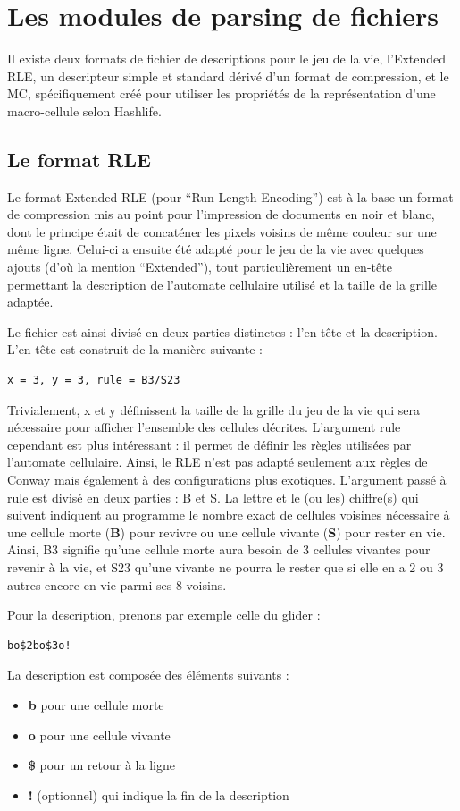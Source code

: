 \documentclass[a4paper,12pt]{report}
\begin{document}
\section{Les modules de parsing de fichiers}\label{section:parsing}

Il existe deux formats de fichier de descriptions pour le jeu de la vie,
l'Extended RLE, un descripteur simple et standard dérivé d'un format de
compression, et le MC, spécifiquement créé pour utiliser les propriétés de
la représentation d'une macro-cellule selon Hashlife.

\subsection{Le format RLE}

Le format Extended RLE (pour ``Run-Length Encoding'') est à la base un format de
compression mis au point pour l'impression de documents en noir et blanc, dont
le principe était de concaténer les pixels voisins de même couleur sur une même
ligne. Celui-ci a ensuite été adapté pour le jeu de la vie avec quelques ajouts
(d'où la mention ``Extended''), tout particulièrement un en-tête permettant la
description de l'automate cellulaire utilisé et la taille de la grille adaptée.

Le fichier est ainsi divisé en deux parties distinctes : l'en-tête et la
description. L'en-tête est construit de la manière suivante :
\begin{verbatim}
x = 3, y = 3, rule = B3/S23
\end{verbatim}

Trivialement, x et y définissent la taille de la grille du jeu de la
vie qui sera nécessaire pour afficher l'ensemble des cellules
décrites. L'argument rule cependant est plus intéressant : il permet
de définir les règles utilisées par l'automate cellulaire. Ainsi, le
RLE n'est pas adapté seulement aux règles de Conway mais
également à des configurations plus exotiques. L'argument passé à rule
est divisé en deux parties : B et S. La lettre et le (ou les)
chiffre(s) qui suivent indiquent au programme le nombre exact de
cellules voisines nécessaire à une cellule morte (\textbf{B}) pour revivre ou une
cellule vivante (\textbf{S}) pour rester en vie. Ainsi, B3 signifie
qu'une cellule morte aura besoin de 3 cellules vivantes pour revenir à
la vie, et S23 qu'une vivante ne pourra le rester que si
elle en a 2 ou 3 autres encore en vie parmi ses 8 voisins.

Pour la description, prenons par exemple celle du glider :
\begin{verbatim}
bo$2bo$3o!
\end{verbatim}
La description est composée des éléments suivants :
\begin{itemize}
\item \textbf{b} pour une cellule morte
\item \textbf{o} pour une cellule vivante
\item \textbf{\$} pour un retour à la ligne
\item \textbf{!} (optionnel) qui indique la fin de la description
\end{itemize}
\end{document}
